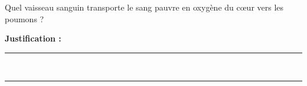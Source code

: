 Quel vaisseau sanguin transporte le sang pauvre en oxygène du cœur vers les poumons ?

\choices

\noindent\textbf{Justification :} \hrulefill \\[2.5ex]
\rule{\linewidth}{0.4pt} \\[2.5ex]
\rule{\linewidth}{0.4pt}
\vfill
